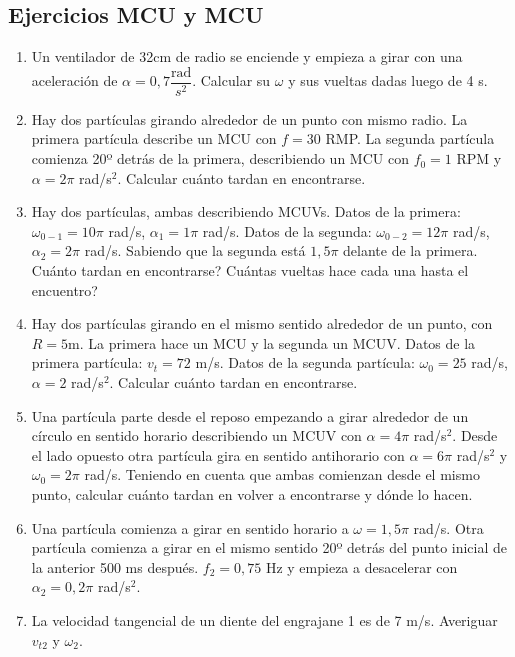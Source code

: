 \subsection*{Ejercicios MCU y MCU}
\begin{enumerate}[label=\arabic*)]

\item Un ventilador de 32cm de radio se enciende y empieza a girar con una aceleración de $\alpha = 0,7 \dfrac{\text{rad}}{s^2}$. Calcular su $\omega$ y sus vueltas dadas luego de 4 s.

\item Hay dos partículas girando alrededor de un punto con mismo radio. La primera partícula describe un MCU con $f = 30$ RMP. La segunda partícula comienza 20º detrás de la primera, describiendo un MCU con $f_0 = 1$ RPM y $\alpha =2\pi$ rad/s$^2$. Calcular cuánto tardan en encontrarse.

\item Hay dos partículas, ambas describiendo MCUVs. Datos de la primera: $\omega_{0-1}=10\pi$ rad/s, $\alpha_1=1\pi$ rad/s. Datos de la segunda: $\omega_{0-2}=12\pi$ rad/s, $\alpha_2=2\pi$ rad/s. Sabiendo que la segunda está $1,5\pi$ delante de la primera. Cuánto tardan en encontrarse? Cuántas vueltas hace cada una hasta el encuentro?

\item Hay dos partículas girando en el mismo sentido alrededor de un punto, con $R=5$m. La primera hace un MCU y la segunda un MCUV. Datos de la primera partícula: $v_t=72$ m/s. Datos de la segunda partícula: $\omega_0=25$ rad/s, $\alpha= 2$ rad/s$^2$. Calcular cuánto tardan en encontrarse.

\item Una partícula parte desde el reposo empezando a girar alrededor de un círculo en sentido horario describiendo un MCUV con $\alpha = 4\pi$ rad/s$^2$. Desde el lado opuesto otra partícula gira en sentido antihorario con $\alpha = 6\pi$ rad/s$^2$ y $\omega_0=2\pi$ rad/s. Teniendo en cuenta que ambas comienzan desde el mismo punto, calcular cuánto tardan en volver a encontrarse y dónde lo hacen.

\item Una partícula comienza a girar en sentido horario a $\omega=1,5\pi$ rad/s. Otra partícula comienza a girar en el mismo sentido 20º detrás del punto inicial de la anterior 500 ms después. $f_2 = 0,75$ Hz y empieza a desacelerar con $\alpha_2 = 0,2\pi$ rad/s$^2$.

\item La velocidad tangencial de un diente del engrajane 1 es de 7 m/s. Averiguar $v_{t2}$ y $\omega_2$.


\end{enumerate}
